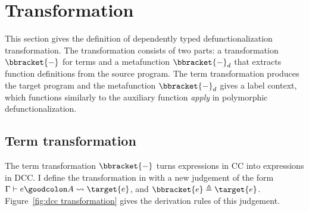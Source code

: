 


\section{Transformation}

This section gives the definition of dependently typed defunctionalization transformation.
The transformation consists of two parts: a transformation $\bbracket{-}$ for terms and a metafunction $\bbracket{-}_d$ that extracts function definitions from the source program. The term transformation produces the target program and the metafunction $\bbracket{-}_d$ gives a label context, which functions similarly to the auxiliary function \textit{apply} in polymorphic defunctionalization.

\subsection{Term transformation}

The term transformation $\bbracket{-}$ turns expressions in CC into expressions in DCC. I define the transformation in with a new judgement of the form $\Gamma \vdash e \goodcolon A \leadsto \target{e}$, and $\bbracket{e} \triangleq \target{e}$. Figure~\ref{fig:dcc transformation} gives the derivation rules of this judgement.


